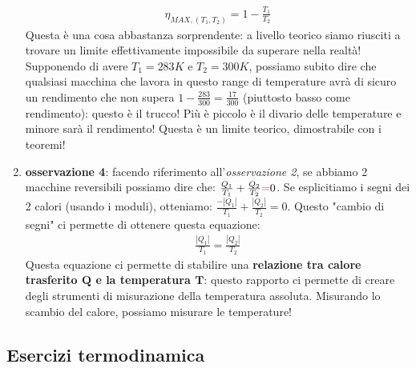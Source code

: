 \begin{enumerate}
                    \begin{align*}
                        \eta_{MAX, (T_1, T_2)} = 1-\frac{T_1}{T_2}
                    \end{align*}
                    Questa è una cosa abbastanza sorprendente: a livello teorico siamo riusciti a trovare un limite effettivamente impossibile da superare nella realtà! Supponendo di avere $T_1 = 283K$ e $T_2 = 300K$, possiamo subito dire che qualsiasi macchina che lavora in questo range di temperature avrà di sicuro un rendimento che non supera $1-\frac{283}{300} = \frac{17}{300}$ (piuttosto basso come rendimento): questo è il trucco! Più è piccolo è il divario delle temperature e minore sarà il rendimento! Questa è un limite teorico, dimostrabile con i teoremi!
                    \item \textbf{osservazione 4}: facendo riferimento all'\textit{osservazione 2}, se abbiamo 2 macchine reversibili possiamo dire che: $\frac{Q_1}{T_1}+ \frac{Q_2}{T_2} \textcolor{Red}{=} 0$. Se esplicitiamo i segni dei 2 calori (usando i moduli), otteniamo: $\frac{-|Q_1|}{T_1}+ \frac{|Q_2|}{T_2} = 0$. Questo "cambio di segni" ci permette di ottenere questa equazione:
                    \begin{align*}
                        \frac{|Q_1|}{T_1} = \frac{|Q_2|}{T_2}
                    \end{align*}
                    Questa equazione ci permette di stabilire una \textbf{relazione tra calore trasferito $\mathbf{Q}$ e la temperatura $\mathbf{T}$}: questo rapporto ci permette di creare degli strumenti di misurazione della temperatura assoluta. Misurando lo scambio del calore, possiamo misurare le temperature!
                \end{enumerate}


    \subsection{Esercizi termodinamica}
